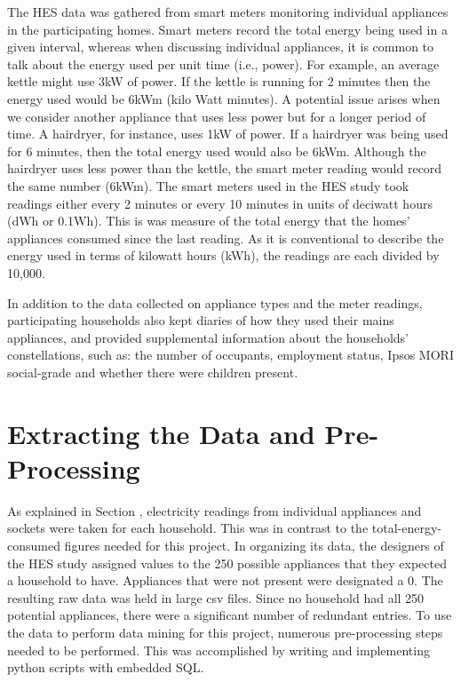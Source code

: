 The HES data was gathered from smart meters monitoring individual appliances in the participating homes. Smart meters record the total energy being used in a given interval, whereas when discussing individual appliances, it is common to talk about the energy used per unit time (i.e., power). For example, an average kettle might use 3kW of power. If the kettle is running for 2 minutes then the energy used would be 6kWm (kilo Watt minutes). A potential issue arises when we consider another appliance that uses less power but for a longer period of time. A hairdryer, for instance, uses 1kW of power. If a hairdryer was being used for 6 minutes, then the total energy used would also be 6kWm. Although the hairdryer uses less power than the kettle, the smart meter reading would record the same number (6kWm). The smart meters used in the HES study took readings either every 2 minutes or every 10 minutes in units of deciwatt hours (dWh or 0.1Wh). This is was measure of the total energy that the homes' appliances consumed since the last reading. As it is conventional to describe the energy used in terms of kilowatt hours (kWh), the readings are each divided by 10,000.

In addition to the data collected on appliance types and the meter readings, participating households also kept diaries of how they used their mains appliances, and provided supplemental information about the households' constellations, such as: the number of occupants, employment status, Ipsos MORI social-grade and whether there were children present.


\section{Extracting the Data and Pre-Processing}
\label{sec:preprocessing}

As explained in Section \mentionOfAggregationSection, electricity readings from individual appliances and sockets were taken for each household.  This was in contrast to the total-energy-consumed figures needed for this project. In organizing its data, the designers of the HES study assigned values to the 250 possible appliances that they expected a household to have.  Appliances that were not present were designated a 0.  The resulting raw data was held in large csv files.  Since no household had all 250 potential appliances, there were a significant number of redundant entries. To use the data to perform data mining for this project, numerous pre-processing steps needed to be performed.  This was accomplished by writing and implementing python scripts with embedded SQL.

